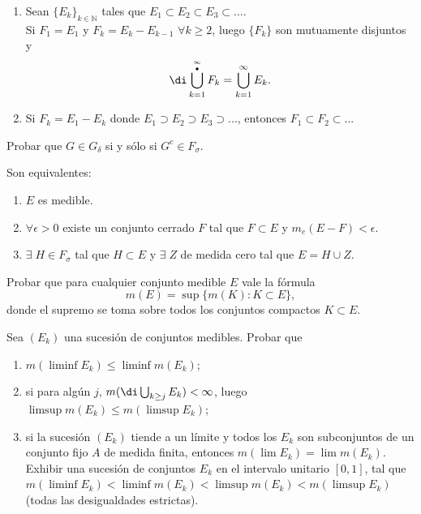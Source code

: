 \documentclass{book}
\newcommand{\nn}{\mathbb{N}}
\begin{document}
   \begin{ejer}{} 
	\begin{enumerate}
  \item Sean $\{E_k\}_{k \in \nn}$ tales que $E_1 \subset E_2 \subset E_3\subset... $.
  \\
  Si $F_1=E_1$ y $F_k=E_k-E_{k-1}$ $\forall k\geq 2$, luego $\{F_k\}$ son mutuamente disjuntos
  y $$\di\bigcup_{k=1}^{\infty \atop \bullet} F_k=\bigcup_{k=1}^{\infty} E_k.$$
  \item Si $F_k=E_1-E_k$ donde $E_1\supset E_2 \supset E_3 \supset...$, entonces
  $F_1\subset F_2 \subset ...$ 
\end{enumerate} 
\end{ejer}  
%
   \begin{ejer}{}  Probar que $G \in G_{\delta}$ si y sólo si $G^c \in F_{\sigma}$.
	\end{ejer} 
%
%

  \begin{ejer}{} 
	Son equivalentes:
	\begin{enumerate}
    \item $E$ es medible.
    \item $\forall \epsilon >0$ existe un conjunto cerrado $F$ tal que $F \subset E$ y $m_e(E-F)<\epsilon$.
    \item $\exists\; H \in F_{\sigma}$ tal que $H\subset E$ y $\exists\; Z$ de medida cero tal que
    $E=H\cup Z$.
	\end{enumerate}
	\end{ejer} 
%

    \begin{ejer}{} 
	Probar que para cualquier conjunto medible $E$ vale la fórmula
   $$m(E)=\sup\{m(K):K\subset E\}, $$
   donde el supremo se toma sobre todos los conjuntos compactos $K \subset E$.
\end{ejer} 

   \begin{ejer}{} 
	Sea $(E_k)$ una sucesión de conjuntos medibles. Probar que
	\begin{enumerate}
    \item $m(\liminf E_k)\leq \liminf m(E_k)$;
    \item si para alg\'un $j$, \;$m(\di\bigcup_{k\geq j}E_k)<\infty$, luego\; 
    $\limsup m(E_k)\leq m(\limsup E_k)$;
    \item si la sucesión $(E_k)$ tiende a un límite y todos los $E_k$ son subconjuntos
    de un conjunto fijo $A$ de medida finita, entonces \;$m(\lim E_k)=\lim m(E_k)$.
    \\
    Exhibir una sucesión de conjuntos $E_k$ en el intervalo unitario $[0,1]$, tal que 
    $m(\liminf E_k)<\liminf m(E_k)<\limsup m(E_k)<m(\limsup E_k)$  (todas las desigualdades estrictas).
	\end{enumerate}
	\end{ejer} 
\end{document}
